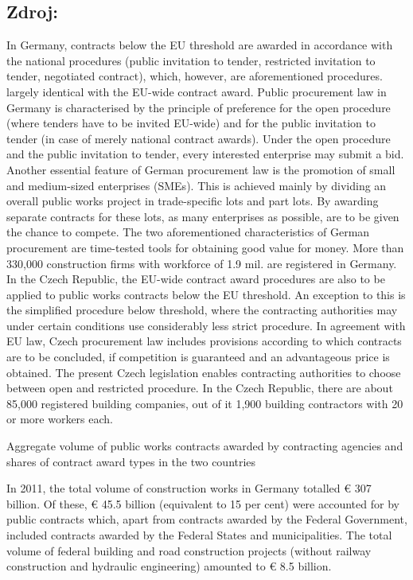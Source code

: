 \documentclass[10pt]{article}
\begin{document}
\subsection*{Zdroj:}

In Germany, contracts below the EU threshold are awarded in accordance with the national procedures (public invitation to tender, restricted invitation to tender, negotiated contract), which, however, are aforementioned procedures. largely identical with the EU-wide contract award.
Public procurement law in Germany is characterised by the principle of preference for the open procedure (where tenders have to be invited EU-wide) and for the public invitation to tender (in case of merely national contract awards).
Under the open procedure and the public invitation to tender, every interested enterprise may submit a bid.
Another essential feature of German procurement law is the promotion of small and medium-sized enterprises (SMEs).
This is achieved mainly by dividing an overall public works project in trade-specific lots and part lots.
By awarding separate contracts for these lots, as many enterprises as possible, are to be given the chance to compete.
The two aforementioned characteristics of German procurement are time-tested tools for obtaining good value for money.
More than 330,000 construction firms with workforce of 1.9 mil. are registered in Germany.
In the Czech Republic, the EU-wide contract award procedures are also to be applied to public works contracts below the EU threshold.
An exception to this is the simplified procedure below threshold, where the contracting authorities may under certain conditions use considerably less strict procedure.
In agreement with EU law, Czech procurement law includes provisions according to which contracts are to be concluded, if competition is guaranteed and an advantageous price is obtained.
The present Czech legislation enables contracting authorities to choose between open and restricted procedure.
In the Czech Republic, there are about 85,000 registered building companies, out of it 1,900 building contractors with 20 or more workers each.


Aggregate volume of public works contracts awarded by contracting agencies and shares of contract award types in the two countries

In 2011, the total volume of construction works in Germany totalled € 307 billion.
Of these, € 45.5 billion (equivalent to 15 per cent) were accounted for by public contracts which, apart from contracts awarded by the Federal Government, included contracts awarded by the Federal States and municipalities.
The total volume of federal building and road construction projects (without railway construction and hydraulic engineering) amounted to € 8.5 billion.
\end{document}
